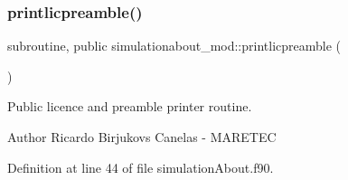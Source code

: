 \subsubsection{\texorpdfstring{printlicpreamble()}{printlicpreamble()}}
{\footnotesize\ttfamily subroutine, public simulationabout\+\_\+mod\+::printlicpreamble (\begin{DoxyParamCaption}{ }\end{DoxyParamCaption})}



Public licence and preamble printer routine. 

\begin{DoxyAuthor}{Author}
Ricardo Birjukovs Canelas -\/ M\+A\+R\+E\+T\+EC 
\end{DoxyAuthor}


Definition at line 44 of file simulation\+About.\+f90.


